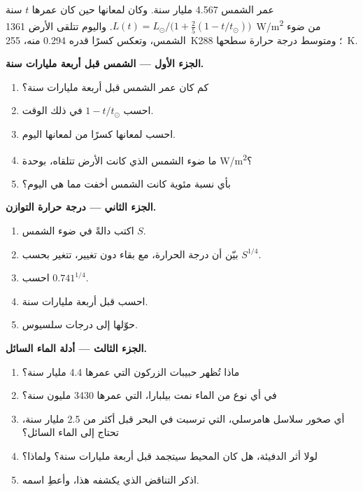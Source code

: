 \begin{problem}
\label{pb:g12:early-earth:1}
عمر الشمس \num{4.567} مليار سنة. وكان لمعانها حين كان عمرها $t$
سنة $L(t) = L_\odot/\bigl(1 + \tfrac25 (1 - t/t_\odot)\bigr)$. واليوم
تتلقى الأرض \qty{1361}{W/m^2} من ضوء الشمس، وتعكس كسرًا قدره 0.294
منه،  \qty{255}{K}؛ ومتوسط درجة حرارة
سطحها \qty{288}{K}.

\medskip
\noindent\textbf{الجزء الأول --- الشمس قبل أربعة مليارات سنة.}
\begin{enumerate}
  \item كم كان عمر الشمس قبل أربعة مليارات سنة؟
  \item احسب $1 - t/t_\odot$ في ذلك الوقت.
  \item احسب لمعانها كسرًا من لمعانها اليوم.
  \item ما ضوء الشمس الذي كانت الأرض تتلقاه، بوحدة \unit{W/m^2}؟
  \item بأي نسبة مئوية كانت الشمس أخفت مما هي اليوم؟
\end{enumerate}

\medskip
\noindent\textbf{الجزء الثاني --- درجة حرارة التوازن.}
\begin{enumerate}[resume]
  \item اكتب  دالةً في ضوء الشمس $S$.
  \item بيّن أن درجة الحرارة، مع بقاء  دون تغيير، تتغير بحسب
        $S^{1/4}$.
  \item احسب $0.741^{1/4}$.
  \item احسب  قبل أربعة مليارات سنة.
  \item حوّلها إلى درجات سلسيوس.
\end{enumerate}

\medskip
\noindent\textbf{الجزء الثالث --- أدلة الماء السائل.}
\begin{enumerate}[resume]
  \item ماذا تُظهر حبيبات الزركون التي عمرها 4.4 مليار سنة؟
  \item في أي نوع من الماء نمت  بيلبارا، التي
        عمرها \num{3430} مليون سنة؟
  \item أي صخور سلاسل هامرسلي، التي ترسبت في البحر قبل أكثر من
        2.5 مليار سنة، تحتاج إلى الماء السائل؟
  \item لولا أثر الدفيئة، هل كان المحيط سيتجمد قبل أربعة
        مليارات سنة؟ ولماذا؟
  \item اذكر التناقض الذي يكشفه هذا، وأعطِ اسمه.
\end{enumerate}


\end{problem}
